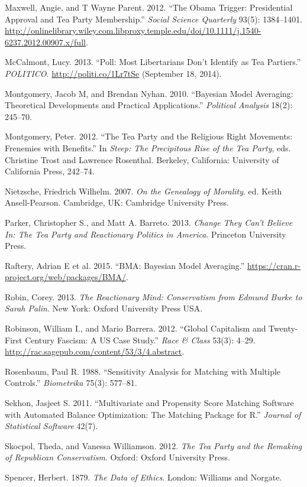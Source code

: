 \documentclass[12pt,]{article}
\begin{document}
Maxwell, Angie, and T Wayne Parent. 2012. ``The Obama Trigger:
Presidential Approval and Tea Party Membership.'' \emph{Social Science
Quarterly} 93(5): 1384--1401.
\url{http://onlinelibrary.wiley.com.libproxy.temple.edu/doi/10.1111/j.1540-6237.2012.00907.x/full}.

McCalmont, Lucy. 2013. ``Poll: Most Libertarians Don't Identify as Tea
Partiers.'' \emph{POLITICO}. \url{http://politi.co/1Lr7tSe} (September
18, 2014).

Montgomery, Jacob M, and Brendan Nyhan. 2010. ``Bayesian Model
Averaging: Theoretical Developments and Practical Applications.''
\emph{Political Analysis} 18(2): 245--70.

Montgomery, Peter. 2012. ``The Tea Party and the Religious Right
Movements: Frenemies with Benefits.'' In \emph{Steep: The Precipitous
Rise of the Tea Party}, eds. Christine Trost and Lawrence Rosenthal.
Berkeley, California: University of California Press, 242--74.

Nietzsche, Friedrich Wilhelm. 2007. \emph{On the Genealogy of Morality}.
ed. Keith Ansell-Pearson. Cambridge, UK: Cambridge University Press.

Parker, Christopher S., and Matt A. Barreto. 2013. \emph{Change They
Can't Believe In: The Tea Party and Reactionary Politics in America}.
Princeton University Press.

Raftery, Adrian E et al. 2015. ``BMA: Bayesian Model Averaging.''
\url{https://cran.r-project.org/web/packages/BMA/}.

Robin, Corey. 2013. \emph{The Reactionary Mind: Conservatism from Edmund
Burke to Sarah Palin}. New York: Oxford University Press USA.

Robinson, William I., and Mario Barrera. 2012. ``Global Capitalism and
Twenty-First Century Fascism: A US Case Study.'' \emph{Race \& Class}
53(3): 4--29. \url{http://rac.sagepub.com/content/53/3/4.abstract}.

Rosenbaum, Paul R. 1988. ``Sensitivity Analysis for Matching with
Multiple Controls.'' \emph{Biometrika} 75(3): 577--81.

Sekhon, Jasjeet S. 2011. ``Multivariate and Propensity Score Matching
Software with Automated Balance Optimization: The Matching Package for
R.'' \emph{Journal of Statistical Software} 42(7).

Skocpol, Theda, and Vanessa Williamson. 2012. \emph{The Tea Party and
the Remaking of Republican Conservatism}. Oxford: Oxford University
Press.

Spencer, Herbert. 1879. \emph{The Data of Ethics}. London: Williams and
Norgate.
\end{document}

